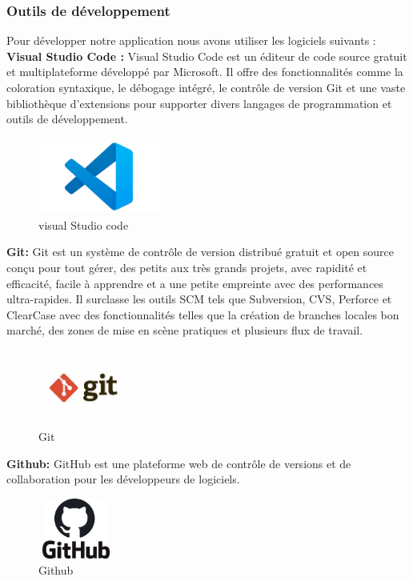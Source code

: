 \documentclass[edit,12pt,a4paper,ChapStyle,oneside,doubleinterligne]{report}
\begin{document}
\subsubsection{Outils de développement }
Pour développer notre application nous avons utiliser les logiciels suivants :
\newline\textbf {Visual Studio Code : }Visual Studio Code est un éditeur de code source gratuit et multiplateforme développé par Microsoft. Il offre des fonctionnalités comme la coloration syntaxique, le débogage intégré, le contrôle de version Git et une vaste bibliothèque d'extensions pour supporter divers langages de programmation et outils de développement\cite{vscode}.
\begin{figure}[H]\label{fig:vscode}
    \centering
    \includegraphics[width=4cm , height = 2.5cm , angle=360]{images/vscode.png}
    \caption{visual Studio code}
    \end{figure}
\textbf {Git: }Git est un système de contrôle de version distribué gratuit et open source conçu pour tout gérer, des petits aux très grands projets, avec rapidité et efficacité, facile à apprendre et a une petite empreinte avec des performances ultra-rapides. Il surclasse les outils SCM tels que Subversion, CVS, Perforce et ClearCase avec des fonctionnalités telles que la création de branches locales bon marché, des zones de mise en scène pratiques et plusieurs flux de travail\cite{git}.
\begin{figure}[H]
    \centering
    \includegraphics[width=3cm , height = 2.5cm , angle=360]{images/git.jpg}
    \caption{Git}
    \label{fig:git}
\end{figure}
  \textbf {Github: }GitHub est une plateforme web de contrôle de versions et de collaboration pour les développeurs de logiciels\cite{github}.
  \begin{figure} [H]
    \centering
    \includegraphics[width=2.5cm , height = 2cm , angle=360]{images/github.png}
    \caption{Github}
    \label{fig:github}
\end{figure}
\end{document}
